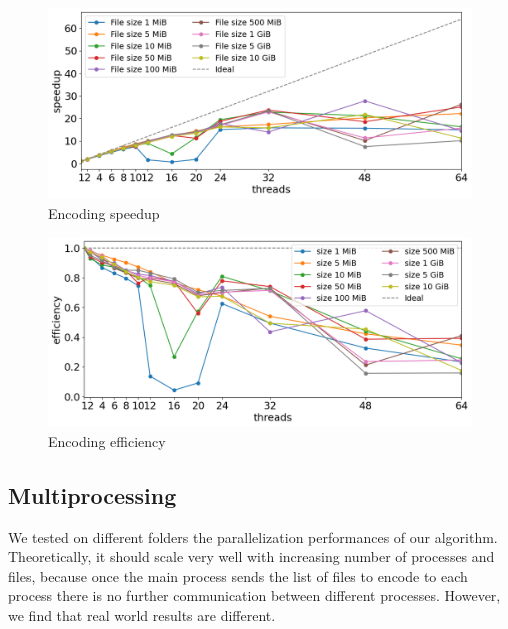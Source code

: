 \begin{figure}
	\centering
	\includegraphics[width=1\linewidth]{"../imgs/encoding speedup wide"}
	\caption{Encoding speedup}
	\label{fig:encoding-speedup}
\end{figure}
\begin{figure}
	\centering
	\includegraphics[width=1\linewidth]{"../imgs/encode efficiency wide"}
	\caption{Encoding efficiency}
	\label{fig:encoding-efficiency}
\end{figure}


\subsection{Multiprocessing}
We tested on different folders the parallelization performances of our algorithm. Theoretically, it should scale very well with increasing number of processes and files, because once the main process sends the list of files to encode to each process there is no further communication between different processes. However, we find that real world results are different.

